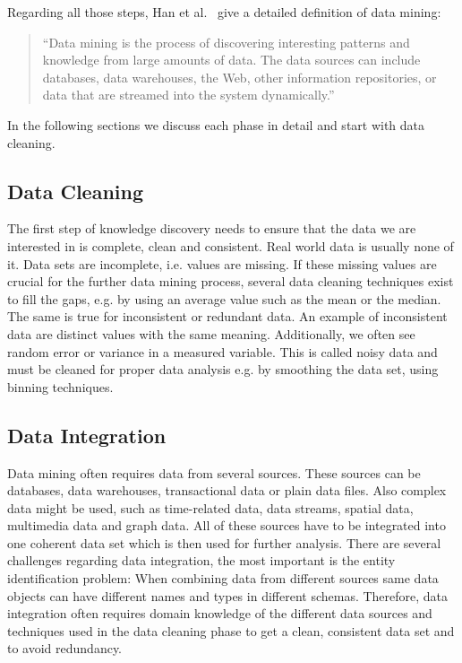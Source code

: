 Regarding all those steps, Han et al.~\parencite[8]{dmbook} give a detailed definition of data mining: 
\begin{quote}
“Data mining is the process of discovering interesting patterns and knowledge from large amounts of data. The data sources can include databases, data warehouses, the Web, other information repositories, or data that are streamed into the system dynamically.”
\end{quote}

In the following sections we discuss each phase in detail and start with data cleaning. 

\subsection{Data Cleaning} 
The first step of knowledge discovery needs to ensure that the data we are interested in is complete, clean and consistent. Real world data is usually none of it. Data sets are incomplete, i.e. values are missing. If these missing values are crucial for the further data mining process, several data cleaning techniques exist to fill the gaps, e.g. by using an average value such as the mean or the median.
\\
The same is true for inconsistent or redundant data. An example of inconsistent data are distinct values with the same meaning. Additionally, we often see random error or variance in a measured variable. This is called noisy data and must be cleaned for proper data analysis e.g. by smoothing the data set, using binning techniques.


\subsection{Data Integration}

Data mining often requires data from several sources. These sources can be databases, data warehouses, transactional data or plain data files. Also complex data might be used, such as time-related data, data streams, spatial data, multimedia data and graph data. All of these sources have to be integrated into one coherent data set which is then used for further analysis. There are several challenges regarding data integration, the most important is the entity identification problem: When combining data from different sources same data objects can have different names and types in different schemas. Therefore, data integration often requires domain knowledge of the different data sources and techniques used in the data cleaning phase to get a clean, consistent data set and to avoid redundancy.


